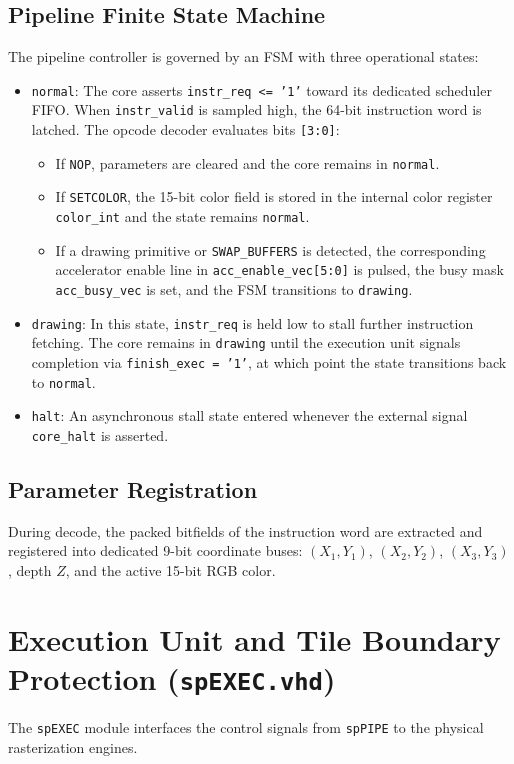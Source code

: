 \subsection{Pipeline Finite State Machine}
The pipeline controller is governed by an FSM with three operational states:
\begin{itemize}
    \item \texttt{normal}: The core asserts \texttt{instr\_req <= '1'} toward its dedicated scheduler FIFO. When \texttt{instr\_valid} is sampled high, the 64-bit instruction word is latched. The opcode decoder evaluates bits \texttt{[3:0]}:
    \begin{itemize}
        \item If \texttt{NOP}, parameters are cleared and the core remains in \texttt{normal}.
        \item If \texttt{SETCOLOR}, the 15-bit color field is stored in the internal color register \texttt{color\_int} and the state remains \texttt{normal}.
        \item If a drawing primitive or \texttt{SWAP\_BUFFERS} is detected, the corresponding accelerator enable line in \texttt{acc\_enable\_vec[5:0]} is pulsed, the busy mask \texttt{acc\_busy\_vec} is set, and the FSM transitions to \texttt{drawing}.
    \end{itemize}
    \item \texttt{drawing}: In this state, \texttt{instr\_req} is held low to stall further instruction fetching. The core remains in \texttt{drawing} until the execution unit signals completion via \texttt{finish\_exec = '1'}, at which point the state transitions back to \texttt{normal}.
    \item \texttt{halt}: An asynchronous stall state entered whenever the external signal \texttt{core\_halt} is asserted.
\end{itemize}

\subsection{Parameter Registration}
During decode, the packed bitfields of the instruction word are extracted and registered into dedicated 9-bit coordinate buses: $(X_1, Y_1)$, $(X_2, Y_2)$, $(X_3, Y_3)$, depth $Z$, and the active 15-bit RGB color.

\section{Execution Unit and Tile Boundary Protection (\texttt{spEXEC.vhd})}
The \texttt{spEXEC} module interfaces the control signals from \texttt{spPIPE} to the physical rasterization engines.

